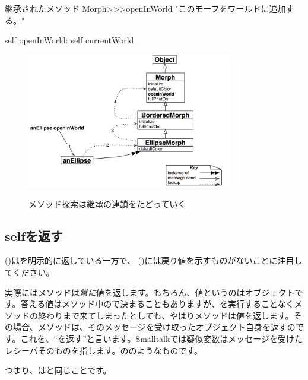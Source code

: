 \documentclass[a4paper,10pt,twoside]{book}
\begin{document}
\begin{method}[openInWorld]{継承されたメソッド}
Morph>>>openInWorld
	"このモーフをワールドに追加する。"

	self openInWorld: self currentWorld
\end{method}

\begin{figure}[htb]
\begin{center}
	{\includegraphics[width=0.8\textwidth]{openInWorldLookup}}
\caption{メソッド探索は継承の連鎖をたどっていく}
\end{center}
\end{figure}

\subsection{selfを返す} 

 ()はを明示的に返している一方で、 ()には戻り値を示すものがないことに注目してください。

実際にはメソッドは\emph{常に}値を返します。もちろん、値というのはオブジェクトです。答える値はメソッド中の\ct{^}で決まることもありますが、\ct{^}を実行することなくメソッドの終わりまで来てしまったとしても、やはりメソッドは値を返します。その場合、メソッドは、そのメッセージを受け取ったオブジェクト自身を返すのです。これを、``\self を返す''と言います。Smalltalkでは疑似変数\self はメッセージを受けたレシーバそのものを指します。ののようなものです。

つまり、はと同じことです。
\end{document}
